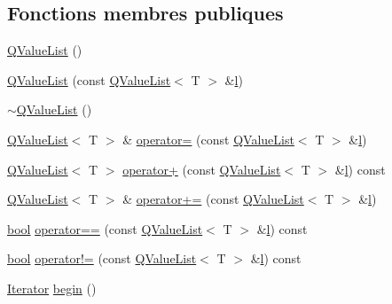 \subsection*{Fonctions membres publiques}
\begin{DoxyCompactItemize}
\item 
\hyperlink{class_q_value_list_ab510376a550afa49444ef73aa64bd057}{Q\+Value\+List} ()
\item 
\hyperlink{class_q_value_list_aff4011e3853386e396274669a259eb85}{Q\+Value\+List} (const \hyperlink{class_q_value_list}{Q\+Value\+List}$<$ T $>$ \&\hyperlink{060__command__switch_8tcl_aff56f84b49947b84b2a304f51cf8e678}{l})
\item 
\hyperlink{class_q_value_list_a9d86a214556b4d131eace071df08fc99}{$\sim$\+Q\+Value\+List} ()
\item 
\hyperlink{class_q_value_list}{Q\+Value\+List}$<$ T $>$ \& \hyperlink{class_q_value_list_aa22c14655a83ab12603d3cd090b96f7b}{operator=} (const \hyperlink{class_q_value_list}{Q\+Value\+List}$<$ T $>$ \&\hyperlink{060__command__switch_8tcl_aff56f84b49947b84b2a304f51cf8e678}{l})
\item 
\hyperlink{class_q_value_list}{Q\+Value\+List}$<$ T $>$ \hyperlink{class_q_value_list_ac3dffb4a61c888bf83642845c36242ae}{operator+} (const \hyperlink{class_q_value_list}{Q\+Value\+List}$<$ T $>$ \&\hyperlink{060__command__switch_8tcl_aff56f84b49947b84b2a304f51cf8e678}{l}) const 
\item 
\hyperlink{class_q_value_list}{Q\+Value\+List}$<$ T $>$ \& \hyperlink{class_q_value_list_a8e29ee0d5707ad877cc9923f6bfd0b1c}{operator+=} (const \hyperlink{class_q_value_list}{Q\+Value\+List}$<$ T $>$ \&\hyperlink{060__command__switch_8tcl_aff56f84b49947b84b2a304f51cf8e678}{l})
\item 
\hyperlink{qglobal_8h_a1062901a7428fdd9c7f180f5e01ea056}{bool} \hyperlink{class_q_value_list_ace8da89397923ba2777825764483577f}{operator==} (const \hyperlink{class_q_value_list}{Q\+Value\+List}$<$ T $>$ \&\hyperlink{060__command__switch_8tcl_aff56f84b49947b84b2a304f51cf8e678}{l}) const 
\item 
\hyperlink{qglobal_8h_a1062901a7428fdd9c7f180f5e01ea056}{bool} \hyperlink{class_q_value_list_a2b7201ad31ad759e05926459cc3a6db0}{operator!=} (const \hyperlink{class_q_value_list}{Q\+Value\+List}$<$ T $>$ \&\hyperlink{060__command__switch_8tcl_aff56f84b49947b84b2a304f51cf8e678}{l}) const 
\item 
\hyperlink{class_q_value_list_a043c8661906b45f062d493601804a5ea}{Iterator} \hyperlink{class_q_value_list_a3b1ace97594172548eae37aea9c21b40}{begin} ()

\end{DoxyCompactItemize}
